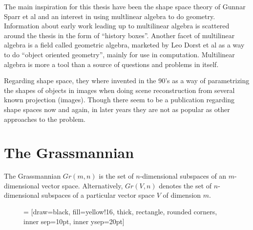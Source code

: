 \documentclass[a4paper,12pt]{book}
\theoremstyle{plain}
\theoremstyle{definition}
\begin{document}
The main inspiration for this thesis have been the shape space theory of Gunnar
Sparr et al and an interest in using multlinear algebra to do geometry.
Information about early work leading up to multilinear algebra is scattered
around the thesis in the form of ``history boxes''. Another facet of
multilinear algebra is a field called geometric algebra, marketed by Leo Dorst
et al as a way to do ``object oriented geometry'', mainly for use in
computation.  Multilinear algebra is more a tool than a source of questions and
problems in itself.

Regarding shape space, they where invented in the 90's as a way of
parametrizing the shapes of objects in images when doing scene reconstruction
from several known projection (images). Though there seem to be a publication
regarding shape spaces now and again, in later years they are not as popular as
other approaches to the problem.


\section{The Grassmannian} %
\label{sec:the_grassmannian}
The Grassmannian \( Gr(m,n) \) is the set of \( n \)-dimensional subspaces of
an \( m \)-dimensional vector space.
Alternatively, \( Gr(V,n) \) denotes the set of \( n \)-dimensional subspaces
of a particular vector
space \( V \) of dimension \( m \).

\begin{figure}
	 = [draw=black, fill=yellow!16, thick,
	rectangle, rounded corners, inner sep=10pt, inner ysep=20pt]
\end{figure}
\end{document}
